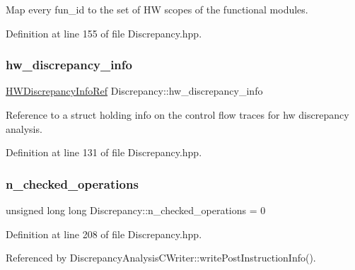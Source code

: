 Map every fun\+\_\+id to the set of HW scopes of the functional modules. 



Definition at line 155 of file Discrepancy.\+hpp.

\mbox{\label{structDiscrepancy_a996c85a4aeed53e65901fdaec07630ae}} 
\subsubsection{\texorpdfstring{hw\+\_\+discrepancy\+\_\+info}{hw\_discrepancy\_info}}
{\footnotesize\ttfamily \hyperlink{Discrepancy_8hpp_a17b9b60c3df0b3aa36e80b29c6b1168c}{H\+W\+Discrepancy\+Info\+Ref} Discrepancy\+::hw\+\_\+discrepancy\+\_\+info}



Reference to a struct holding info on the control flow traces for hw discrepancy analysis. 



Definition at line 131 of file Discrepancy.\+hpp.

\mbox{\label{structDiscrepancy_a6f30a7f808cbb365f0013d805cda2c3e}} 
\subsubsection{\texorpdfstring{n\+\_\+checked\+\_\+operations}{n\_checked\_operations}}
{\footnotesize\ttfamily unsigned long long Discrepancy\+::n\+\_\+checked\+\_\+operations = 0}



Definition at line 208 of file Discrepancy.\+hpp.



Referenced by Discrepancy\+Analysis\+C\+Writer\+::write\+Post\+Instruction\+Info().

\mbox{\label{structDiscrepancy_aeb8b28098a68db7393b30d939f6702c2}} 
